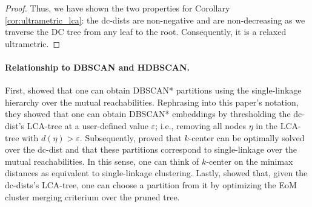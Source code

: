 \begin{proof}
    Thus, we have shown the two properties for Corollary \ref{cor:ultrametric_lca}: the dc-dists are non-negative and are non-decreasing as we traverse the DC tree from any leaf to the root. Consequently, it is a relaxed ultrametric.
\end{proof}

\paragraph{Relationship to DBSCAN and HDBSCAN.} First, \citet{hdbscan} showed that one can obtain DBSCAN* partitions using the single-linkage hierarchy over the mutual reachabilities. Rephrasing into this paper's notation, they showed that one can obtain DBSCAN* embeddings by thresholding the dc-dist's LCA-tree at a user-defined value $\varepsilon$; i.e., removing all nodes $\eta$ in the LCA-tree with $d(\eta) > \varepsilon$. 
Subsequently, \citet{beer2023connecting} proved that $k$-center can be optimally solved over the dc-dist and that these partitions correspond to single-linkage over the mutual reachabilities. 
In this sense, one can think of $k$-center on the minimax distances as equivalent to single-linkage clustering. 
Lastly, \citet{hdbscan} showed that, given the dc-dists's LCA-tree, one can choose a partition from it by optimizing the EoM cluster merging criterium over the pruned tree.
